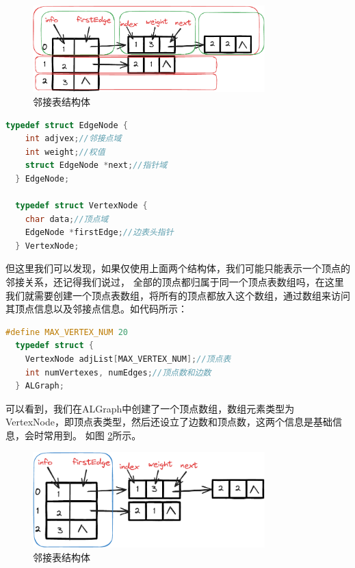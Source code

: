 \documentclass[lang=cn,newtx,10pt,scheme=chinese]{elegantbook}
\begin{document}
\begin{figure}[h!]
  \centering
  \includegraphics[width=0.8\textwidth]{./figure/pdf/cropped/adjacencyList_struct2.pdf}
  \caption{邻接表结构体}
  \label{fig:adjacencyList_struct2}

\end{figure}

\begin{lstlisting}[language=C++, caption={邻接表结构体}]
  typedef struct EdgeNode {
    int adjvex;//邻接点域
    int weight;//权值
    struct EdgeNode *next;//指针域
  } EdgeNode;

  typedef struct VertexNode {
    char data;//顶点域
    EdgeNode *firstEdge;//边表头指针
  } VertexNode;

\end{lstlisting}

但这里我们可以发现，如果仅使用上面两个结构体，我们可能只能表示一个顶点的邻接关系，还记得我们说过，
全部的顶点都归属于同一个顶点表数组吗，在这里我们就需要创建一个顶点表数组，将所有的顶点都放入这个数组，通过数组来访问其顶点信息以及邻接点信息。如代码所示：

\begin{lstlisting}[language=C++, caption={邻接表结构体}]
  #define MAX_VERTEX_NUM 20
  typedef struct {
    VertexNode adjList[MAX_VERTEX_NUM];//顶点表
    int numVertexes, numEdges;//顶点数和边数
  } ALGraph;
\end{lstlisting}

可以看到，我们在ALGraph中创建了一个顶点数组，数组元素类型为VertexNode，即顶点表类型，然后还设立了边数和顶点数，这两个信息是基础信息，会时常用到。
如图 \ref{fig:adjacencyList_struct3}所示。

\begin{figure}[h!]
  \centering
  \includegraphics[width=0.8\textwidth]{./figure/pdf/cropped/adjList_array.pdf}
  \caption{邻接表结构体}
  \label{fig:adjacencyList_struct3}
\end{figure}
\end{document}
